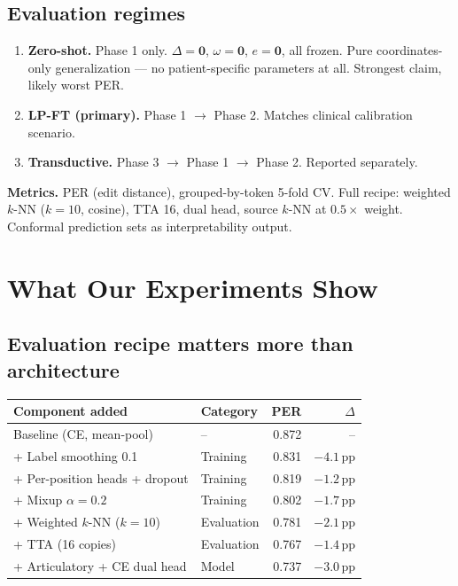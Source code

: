 \documentclass[11pt,letterpaper]{article}
\newcommand{\pp}{\,\text{pp}}
\begin{document}
\subsection{Evaluation regimes}

\begin{enumerate}[leftmargin=2em]
\item \textbf{Zero-shot.} Phase 1 only. $\Delta = \mathbf{0}$, $\omega = \mathbf{0}$, $e = \mathbf{0}$, all frozen. Pure coordinates-only generalization --- no patient-specific parameters at all. Strongest claim, likely worst PER.
\item \textbf{LP-FT (primary).} Phase 1 $\to$ Phase 2. Matches clinical calibration scenario.
\item \textbf{Transductive.} Phase 3 $\to$ Phase 1 $\to$ Phase 2. Reported separately.
\end{enumerate}

\textbf{Metrics.} PER (edit distance), grouped-by-token 5-fold CV. Full recipe: weighted $k$-NN ($k{=}10$, cosine), TTA 16, dual head, source $k$-NN at $0.5\times$ weight. Conformal prediction sets as interpretability output.



\section{What Our Experiments Show}\label{sec:experiments}

\subsection{Evaluation recipe matters more than architecture}

\begin{table}[ht!]
\centering\small
\begin{tabular}{@{}llrr@{}}
\toprule
\textbf{Component added} & \textbf{Category} & \textbf{PER} & \textbf{$\Delta$} \\
\midrule
Baseline (CE, mean-pool) & -- & 0.872 & -- \\
+ Label smoothing 0.1 & Training & 0.831 & $-4.1\pp$ \\
+ Per-position heads + dropout & Training & 0.819 & $-1.2\pp$ \\
+ Mixup $\alpha{=}0.2$ & Training & 0.802 & $-1.7\pp$ \\
+ Weighted $k$-NN ($k{=}10$) & Evaluation & 0.781 & $-2.1\pp$ \\
+ TTA (16 copies) & Evaluation & 0.767 & $-1.4\pp$ \\
+ Articulatory + CE dual head & Model & 0.737 & $-3.0\pp$ \\
\bottomrule
\end{tabular}
\end{table}
\end{document}

